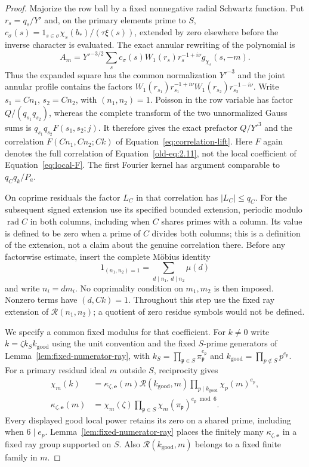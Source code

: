 \documentclass[11pt,a4paper]{article}
\numberwithin{equation}{section}
\numberwithin{figure}{section}
\theoremstyle{definition}
\theoremstyle{remark}
\begin{document}
\begin{proof}
Majorize the row ball by a fixed nonnegative radial Schwartz function.
Put $r_s=q_s/Y'$ and, on the primary elements prime to $S$,
$c_\sigma(s)=1_{s\in\sigma}\chi_s(b_*)/(\tau\xi(s))$, extended by
zero elsewhere before the inverse character is evaluated.  The exact
annular rewriting of the polynomial is
\[
 A_m=Y'^{-3/2}\sum_s c_\sigma(s)W_1(r_s)r_s^{-1+i\nu}
                          g_{\chi_s}(s,-m).
\]
Thus the expanded square has the common normalization $Y'^{-3}$ and
the joint annular profile contains the factors
$W_1(r_{s_1})r_{s_1}^{-1+i\nu}W_1(r_{s_2})r_{s_2}^{-1-i\nu}$.
Write $s_1=Cn_1$, $s_2=Cn_2$, with $(n_1,n_2)=1$.  Poisson in the
row variable has factor $Q/(q_{s_1}q_{s_2})$, whereas the complete
transform of the two unnormalized Gauss sums is
$q_{s_1}q_{s_2}F(s_1,s_2;j)$.  It therefore gives the exact prefactor
$Q/Y'^3$ and the correlation
$F(Cn_1,Cn_2;Ck)$ of Equation~\eqref{eq:correlation-lift}.
Here $F$ again denotes the full correlation of Equation~\eqref{old-eq:2.11},
not the local coefficient of Equation~\eqref{eq:local-F}.
The first Fourier kernel has argument comparable to $q_Cq_k/P_a$.

On coprime residuals the factor $L_C$ in that correlation has
$|L_C|\le q_C$.  For the subsequent signed extension use its specified
bounded extension, periodic modulo $\operatorname{rad}C$ in both
columns, including when $C$ shares primes with a column.  Its value
is defined to be zero when a prime of $C$ divides both columns;
this is a definition of the extension, not a claim about the genuine
correlation there.  Before any factorwise estimate, insert the complete
M\"obius identity
\[
 1_{(n_1,n_2)=1}=\sum_{d\mid n_1,\ d\mid n_2}\mu(d)
\]
and write $n_i=dm_i$.  No coprimality condition on $m_1,m_2$ is then imposed.
Nonzero terms have $(d,Ck)=1$.  Throughout this step use the fixed
ray extension of $\mathcal R(n_1,n_2)$; a quotient of zero residue
symbols would not be defined.

We specify a common fixed modulus for that coefficient.  For $k\ne0$
write $k=\zeta k_Sk_{\mathrm{good}}$ using the unit convention and the
fixed $S$-prime generators of Lemma~\ref{lem:fixed-numerator-ray}, with
$k_S=\prod_{\mathfrak p\in S}\pi_{\mathfrak p}^{e_{\mathfrak p}}$
and $k_{\mathrm{good}}=\prod_{p\notin S}p^{e_p}$.  For a primary
residual ideal $m$ outside $S$, reciprocity gives
\[
 \begin{split}
 \chi_m(k)&=\kappa_{\zeta,\boldsymbol e}(m)
       \mathcal R(k_{\mathrm{good}},m)
       \prod_{p\mid k_{\mathrm{good}}}\chi_p(m)^{e_p},\\
 \kappa_{\zeta,\boldsymbol e}(m)
       &=\chi_m(\zeta)\prod_{\mathfrak p\in S}
             \chi_m(\pi_{\mathfrak p})^{e_{\mathfrak p}\bmod6}.
 \end{split}
\]
Every displayed good local power retains its zero on a shared prime,
including when $6\mid e_p$.  Lemma~\ref{lem:fixed-numerator-ray}
places the finitely many $\kappa_{\zeta,\boldsymbol e}$ in a fixed ray
group supported on $S$.  Also $\mathcal R(k_{\mathrm{good}},m)$
belongs to a fixed finite family in $m$.


\end{proof}
\end{document}
